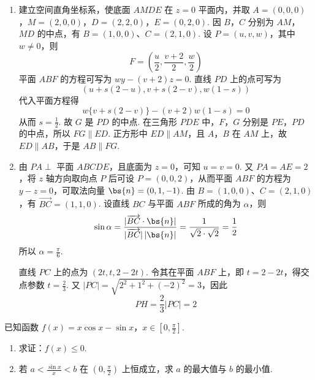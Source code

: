 \begin{solution}
\begin{enumerate}
\item 建立空间直角坐标系，使底面 \(AMDE\) 在 \(z=0\) 平面内，并取
\(A=(0,0,0)\)，\(M=(2,0,0)\)，\(D=(2,2,0)\)，\(E=(0,2,0)\).
因 \(B\)，\(C\) 分别为 \(AM\)，\(MD\) 的中点，有 \(B=(1,0,0)\)、\(C=(2,1,0)\). 设 \(P=(u,v,w)\)，其中 \(w\ne0\)，则
\[
F=\left(\frac u2,\frac{v+2}{2},\frac w2\right)
\]
平面 \(ABF\) 的方程可写为 \(wy-(v+2)z=0\). 直线 \(PD\) 上的点可写为
\[
(u+s(2-u),v+s(2-v),w(1-s))
\]
代入平面方程得
\[
w\{v+s(2-v)\}-(v+2)w(1-s)=0
\]
从而 \(s=\frac12\). 故 \(G\) 是 \(PD\) 的中点. 在三角形 \(PDE\) 中，\(F\)，\(G\) 分别是 \(PE\)，\(PD\) 的中点，所以 \(FG\parallel ED\). 正方形中 \(ED\parallel AM\)，且 \(A\)，\(B\) 在 \(AM\) 上，故 \(ED\parallel AB\)，于是 \(AB\parallel FG\).
\item 由 \(PA\perp\) 平面 \(ABCDE\)，且底面为 \(z=0\)，可知 \(u=v=0\). 又 \(PA=AE=2\)，将 \(z\) 轴方向取向点 \(P\) 后可设 \(P=(0,0,2)\)，从而平面 \(ABF\) 的方程为 \(y-z=0\)，可取法向量 \(\bs{n}=(0,1,-1)\). 由 \(B=(1,0,0)\)、\(C=(2,1,0)\)，有 \(\overrightarrow{BC}=(1,1,0)\). 设直线 \(BC\) 与平面 \(ABF\) 所成的角为 \(\alpha\)，则
\[
\sin\alpha=\frac{|\overrightarrow{BC}\cdot\bs{n}|}
{|\overrightarrow{BC}|\,|\bs{n}|}
=\frac1{\sqrt2\cdot\sqrt2}=\frac12
\]
所以 \(\alpha=\frac{\pi}{6}\).

直线 \(PC\) 上的点为 \((2t,t,2-2t)\). 令其在平面 \(ABF\) 上，即 \(t=2-2t\)，得交点参数 \(t=\frac23\). 又
\(|PC|=\sqrt{2^{2}+1^{2}+(-2)^{2}}=3\)，因此
\[
PH=\frac23|PC|=2
\]
\end{enumerate}
\end{solution}

\begin{problem}
已知函数 \(f(x) = x\cos x - \sin x\)，\(x \in \left[0, \frac{\pi}{2}\right]\).

\begin{enumerate}
\item 求证：\(f(x) \leqslant 0\).
\item 若 \(a < \frac{\sin x}{x} < b\) 在 \(\left(0, \frac{\pi}{2}\right)\) 上恒成立，求 \(a\) 的最大值与 \(b\) 的最小值.
\end{enumerate}
\end{problem}

